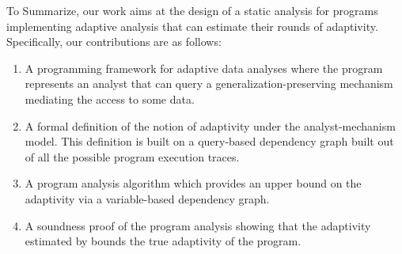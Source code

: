 
To Summarize, our work aims at the design of a static analysis for programs implementing adaptive analysis that can estimate their rounds of adaptivity. Specifically, our contributions are as follows:
\begin{enumerate}
    \item A programming framework for adaptive data analyses where the program represents an analyst that can query a generalization-preserving mechanism mediating the access to some data. 
    \item A formal definition of the notion of adaptivity under the analyst-mechanism model. This definition is built on a query-based dependency graph built out of all the possible program execution traces.
    \item A program analysis algorithm {\THESYSTEM} which provides an upper bound on the adaptivity via a variable-based dependency graph.
    \item A soundness proof of the program analysis showing that the adaptivity estimated by {\THESYSTEM} bounds the true adaptivity of the program. 
\end{enumerate}



